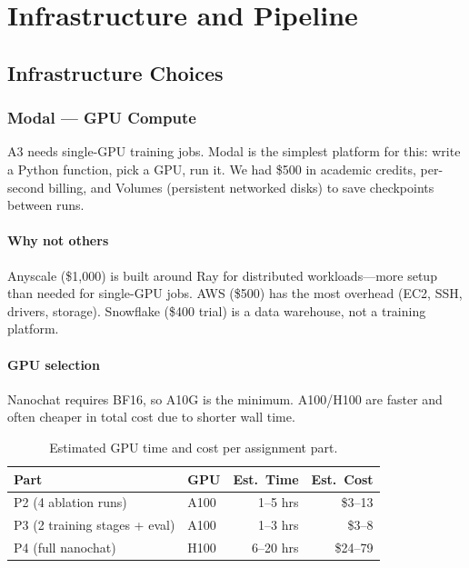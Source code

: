 
\appendix
\section{Infrastructure and Pipeline}
\label{sec:appendix-pipeline}

\subsection{Infrastructure Choices}

\subsubsection{Modal --- GPU Compute}

A3 needs single-GPU training jobs. Modal is the simplest platform for this: write a Python function, pick a GPU, run it. We had \$500 in academic credits, per-second billing, and Volumes (persistent networked disks) to save checkpoints between runs.

\paragraph{Why not others}
Anyscale (\$1{,}000) is built around Ray for distributed workloads---more setup than needed for single-GPU jobs. AWS (\$500) has the most overhead (EC2, SSH, drivers, storage). Snowflake (\$400 trial) is a data warehouse, not a training platform.

\paragraph{GPU selection}
Nanochat requires BF16, so A10G is the minimum. A100/H100 are faster and often cheaper in total cost due to shorter wall time.

\begin{table}[H]
\centering\small
\begin{tabular}{@{}llrr@{}}
\toprule
Part & GPU & Est.\ Time & Est.\ Cost \\
\midrule
P2 (4 ablation runs) & A100 & 1--5 hrs & \$3--13 \\
P3 (2 training stages + eval) & A100 & 1--3 hrs & \$3--8 \\
P4 (full nanochat) & H100 & 6--20 hrs & \$24--79 \\
\bottomrule
\end{tabular}
\caption{Estimated GPU time and cost per assignment part.}
\end{table}

